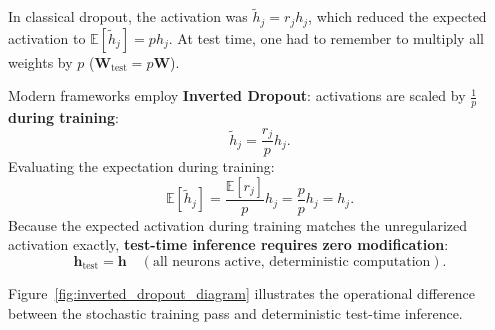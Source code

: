 In classical dropout, the activation was $\tilde{h}_j = r_j h_j$, which reduced the expected activation to $\mathbb{E}[\tilde{h}_j] = p h_j$. At test time, one had to remember to multiply all weights by $p$ ($\mathbf{W}_{\text{test}} = p \mathbf{W}$).

Modern frameworks employ \textbf{Inverted Dropout}: activations are scaled by $\frac{1}{p}$ \textbf{during training}:
\begin{equation}
\tilde{h}_j = \frac{r_j}{p} h_j.
\label{eq:inverted_dropout_formula}
\end{equation}
Evaluating the expectation during training:
\begin{equation}
\mathbb{E}[\tilde{h}_j] = \frac{\mathbb{E}[r_j]}{p} h_j = \frac{p}{p} h_j = h_j.
\label{eq:inverted_dropout_expectation}
\end{equation}
Because the expected activation during training matches the unregularized activation exactly, \textbf{test-time inference requires zero modification}:
\begin{equation}
\mathbf{h}_{\text{test}} = \mathbf{h} \quad (\text{all neurons active, deterministic computation}).
\end{equation}

Figure~\ref{fig:inverted_dropout_diagram} illustrates the operational difference between the stochastic training pass and deterministic test-time inference.


